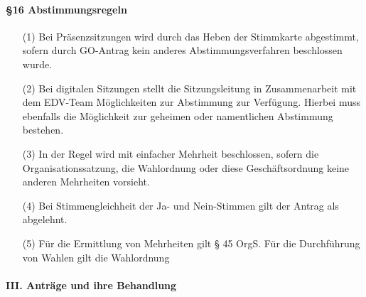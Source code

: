         \paragraph{§16 Abstimmungsregeln}
            \begin{itemize}
                \item[(1)] Bei Präsenzsitzungen wird durch das Heben der Stimmkarte abgestimmt, sofern durch GO-Antrag kein anderes Abstimmungsverfahren beschlossen wurde.
                \item[(2)] Bei digitalen Sitzungen stellt die Sitzungsleitung in Zusammenarbeit mit dem EDV-Team Möglichkeiten zur Abstimmung zur Verfügung. Hierbei muss ebenfalls die Möglichkeit zur geheimen oder namentlichen Abstimmung bestehen.
                \item[(3)] In der Regel wird mit einfacher Mehrheit beschlossen, sofern die Organisationssatzung, die Wahlordnung oder diese Geschäftsordnung keine anderen Mehrheiten vorsieht. 
                \item[(4)] Bei Stimmengleichheit der Ja- und Nein-Stimmen gilt der Antrag als abgelehnt. 
                \item[(5)] Für die Ermittlung von Mehrheiten gilt § 45 OrgS. Für die Durchführung von Wahlen gilt die Wahlordnung
            \end{itemize}
    \paragraph{III. Anträge und ihre Behandlung}
